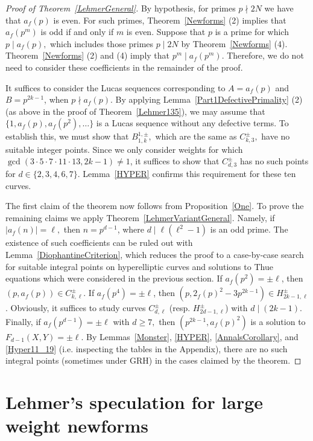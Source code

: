 \documentclass[12pt]{amsart}
\newcommand{\?}{\color{red}?}
\numberwithin{equation}{section}
\begin{document}
\begin{proof}[Proof of Theorem~\ref{LehmerGeneral}]  By hypothesis, for primes $p\nmid 2N$ we have that
$a_f(p)$ is even. For such primes, Theorem~\ref{Newforms} (2) implies that
$a_f(p^{m})$ is odd if and only if $m$ is even.
Suppose that $p$ is a prime for which $p\mid a_f(p),$ which includes those primes $p\mid 2N$ by Theorem~\ref{Newforms} (4).  Theorem~\ref{Newforms} (2) and (4) imply that
$p^m\mid a_f(p^m)$. Therefore, we do not need to consider these coefficients in the remainder of the proof.

It suffices to consider the Lucas sequences corresponding to $A=a_f(p)$ and $B=p^{2k-1}$, when $p\nmid a_f(p)$.
By applying Lemma~\ref{Part1DefectivePrimality} (2) (as above in the proof of Theorem~\ref{Lehmer135}), we may assume that
 $\{1, a_f(p), a_f(p^2),\dots\}$ is a Lucas sequence
without any defective terms. To establish this, we must show that
$B_{1,k}^{1,\pm},$ which are the same as $C_{k,3}^{\pm},$  have no suitable integer points.
Since we only consider weights for which $\gcd(3\cdot 5\cdot 7\cdot 11\cdot 13, 2k-1)\neq 1$, it suffices
to show that $C_{d,3}^{\pm}$ has no such points for $d\in \{2, 3, 4, 6, 7\}$. Lemma~\ref{HYPER} confirms this requirement for
these ten curves.

The first claim of the theorem now follows from Proposition~\ref{One}. To prove the remaining claims we apply Theorem~\ref{LehmerVariantGeneral}.
 Namely, if $|a_f(n)|=\ell,$ then $n=p^{d-1}$, where
 $d\mid \ell (\ell^2-1)$ is an odd prime. The existence of such coefficients can be ruled out
with Lemma~\ref{DiophantineCriterion}, which reduces the proof to a case-by-case search for suitable integral points on hyperelliptic curves and solutions to Thue equations which were considered in the previous section.
If $a_f(p^2)=\pm \ell$, then  $(p,a_f(p))\in C_{k,\ell}^{\pm}$.
If $a_f(p^4)=\pm \ell$, then  $(p, 2_f(p)^2-3p^{2k-1})\in
H_{2k-1,\ell}^{\pm}$. 
Obviously, it suffices to study curves $C_{d,\ell}^{\pm}$  (resp. $H_{2d-1,\ell}^{\pm}$) with $d\mid (2k-1)$.
Finally, if $a_f(p^{d-1})=\pm \ell$  with  $d\geq 7,$ then $(p^{2k-1}, a_f(p)^2)$ is a solution to
$F_{d-1}(X,Y)=\pm \ell.$
By Lemmas~\ref{Monster}, \ref{HYPER}, \ref{AnnalsCorollary}, and \ref{Hyper11_19} (i.e. inspecting the tables in the Appendix), 
there are no such integral points (sometimes under GRH) in the cases claimed by the theorem.
\end{proof}

\section{Lehmer's speculation for large weight newforms}
\end{document}
